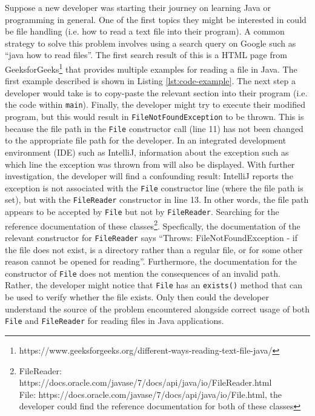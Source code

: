 Suppose a new developer was starting their journey on learning Java or programming in general. One of the first topics they might be interested in could be file handling (i.e. how to read a text file into their program). A common strategy to solve this problem involves using a search query on Google such as ``java how to read files''. The first search result of this is a HTML page from GeeksforGeeks\footnote{https://www.geeksforgeeks.org/different-ways-reading-text-file-java/} that provides multiple examples for reading a file in Java. The first example described is shown in Listing  \ref{lst:code-example}. The next step a developer would take is to copy-paste the relevant section into their program (i.e. the code within \lstinline{main}). Finally, the developer might try to execute their modified program, but this would result in \lstinline{FileNotFoundException} to be thrown. This is because the file path in the \lstinline{File} constructor call (line 11) has not been changed to the appropriate file path for the developer. In an integrated development environment (IDE) such as IntelliJ,  information about the exception such as which line the exception was thrown from will also be displayed. With further investigation, the developer will find a confounding result: IntelliJ reports the exception is not associated with the \lstinline{File} constructor line (where the file path is set), but with the \lstinline{FileReader} constructor in line 13. In other words, the file path appears to be accepted by \lstinline{File} but not by \lstinline{FileReader}. Searching for the reference documentation of these classes\footnote{FileReader: https://docs.oracle.com/javase/7/docs/api/java/io/FileReader.html \\\indent File: https://docs.oracle.com/javase/7/docs/api/java/io/File.html, the developer could find the reference documentation for both of these classes}. Specfically, the documentation of the relevant constructor for \lstinline{FileReader} says ``Throws: FileNotFoundException - if the file does not exist, is a directory rather than a regular file, or for some other reason cannot be opened for reading''. Furthermore, the documentation for the constructor of \lstinline{File} does not mention the consequences of an invalid path. Rather, the developer might notice that \lstinline{File} has an \lstinline{exists()} method that can be used to verify whether the file exists. Only then could the developer understand the source of the problem encountered alongside correct usage of both \lstinline{File} and \lstinline{FileReader} for reading files in Java applications.

